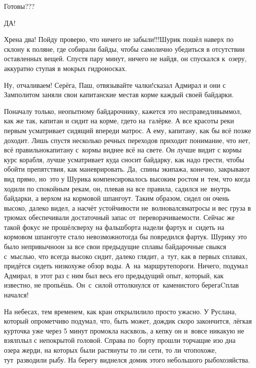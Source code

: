 \diagdash Готовы???

\diagdash ДА!

\diagdash Хрена два! Пойду проверю, что ничего не забыли!!!\mdash Шурик пошёл наверх по склону к поляне, где собирали байды, чтобы самолично убедиться в отсутствии оставленных вещей. Спустя пару минут, ничего не найдя, он спускался к~озеру, аккуратно ступая в мокрых гидроносках.

\diagdash Ну, отчаливаем! Серёга, Паш, отвязывайте чалки!\mdash сказал Адмирал и они с Замполитом заняли свои капитанские места\mdash в корме каждый своей байдарки. 

Поначалу только, неопытному байдарочнику, кажется это несправедливым\mdash мол, как же так, капитан и сидит на корме, где\sdash то на~галёрке. А все красоты реки первым усматривает сидящий впереди матрос. А ему, капитану, как бы всё позже доходит. Лишь спустя несколько речных переходов приходит понимание, что нет, всё правильно\mdash капитану с~кормы виднее всё на свете. Он лучше видит с кормы курс корабля, лучше усматривает куда сносит байдарку, как надо грести, чтобы обойти препятствия, как маневрировать. Да,~спины экипажа, конечно, закрывают вид прямо, но~это у Шурика компенсировалось высоким ростом и~тем, что когда ходили по спокойным рекам, он, плевав на все правила, садился не~внутрь байдарки, а верхом на кормовой шпангоут. Таким образом, сидел он очень высоко, далеко видел, а насчёт устойчивости не~волновался\mdash матросы и вес груза в трюмах обеспечивали достаточный запас от~переворачиваемости. Сейчас же такой фокус не прошёл\mdash сверху на фальшборта надели фартук и~сидеть на кормовом шпангоуте стало невозможно\mdash тогда бы повредился фартук. Шурику это было непривычно\mdash он за все свои предыдущие сплавы байдарочные свыкся с~мыслью, что всегда высоко сидит, далеко глядит, а~тут, как в первых сплавах, придётся сидеть низко\mdash хуже обзор воды. А~на~маршруте\mdash пороги. Ничего, подумал Адмирал, в этот раз с ним был весь его предыдущий опыт, который, как известно, не пропьёшь. Он~с~силой оттолкнулся от~каменистого берега\mdash Cплав начался!

На небесах, тем временем, как кран открыли\mdash лило просто ужасно. У Руслана, который опрометчиво подумал, что, быть может, дождик скоро закончится, лёгкая курточка уже через 5 минут промокла насквозь, а кепку он и~вовсе никакую не взял\mdash плыл с непокрытой головой. Справа по~борту прошли торчащие изо дна озера жерди, на которых были растянуты то ли сети, то ли что\mdash похоже, тут~разводили рыбу. На берегу виднелся домик этого небольшого рыбохозяйства.

